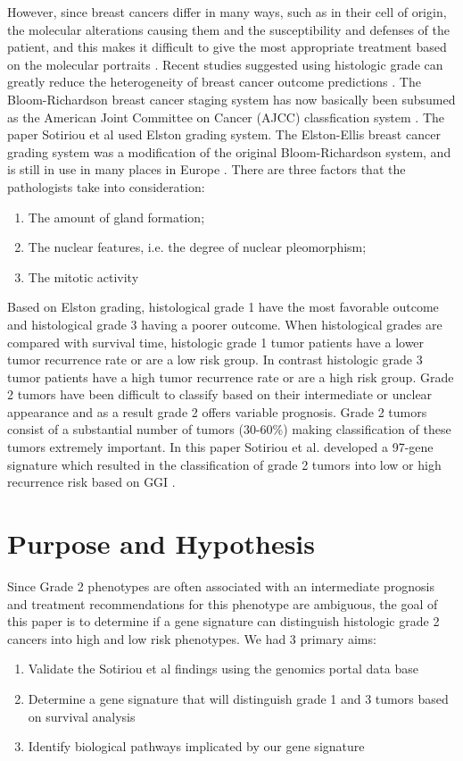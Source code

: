 \documentclass[a4paper,10pt]{article}
\begin{document}
However, since breast cancers differ in many ways, such as in their cell of origin, the 
molecular alterations causing them and the susceptibility and defenses of the patient, 
and this makes it difficult to give the most appropriate treatment based on the molecular
 portraits \cite{bertucci1}. Recent studies suggested using histologic grade can greatly reduce the 
heterogeneity of breast cancer outcome  predictions \cite{dalton1}. The Bloom-Richardson
 breast cancer staging system has now basically been subsumed as the American 
Joint Committee on Cancer (AJCC) classfication system \cite{bloom1}. The paper Sotiriou et al 
used Elston grading system. The Elston-Ellis breast cancer grading system was a 
modification of the original Bloom-Richardson system, and is still in use in many 
places in Europe \cite{Elston1}. There are three factors that the pathologists take into consideration: 

\begin{enumerate}
 \item The amount of gland formation; 
 \item The nuclear features, i.e. the degree of nuclear pleomorphism; 
 \item The mitotic activity \cite{Elston1}
\end{enumerate}

Based on Elston grading, histological grade 1 have the most favorable outcome and 
histological grade 3 having a poorer outcome. When histological grades are compared with
 survival time, histologic grade 1 tumor patients have a lower tumor recurrence rate or are a low 
risk group. In contrast histologic grade 3 tumor patients have a high tumor recurrence rate or are a
 high risk group. Grade 2 tumors have been difficult to classify based on their intermediate or 
unclear appearance and as a result grade 2 offers variable prognosis. Grade 2 tumors consist 
of a substantial number of tumors (30-60\%) making classification of these tumors 
extremely important. In this paper Sotiriou et al. developed a 97-gene signature which 
resulted in the classification of grade 2 tumors into low or high recurrence risk based on GGI \cite{bertucci1}.\\

\section{Purpose and Hypothesis}
Since Grade 2 phenotypes are often associated with an intermediate prognosis and treatment 
recommendations for this phenotype are ambiguous, the goal of this paper is to determine if a 
gene signature can distinguish histologic grade 2 cancers into high and low risk phenotypes.  
We had 3 primary aims: 
\begin{enumerate}
 \item Validate the Sotiriou et al findings using the genomics portal data base
 \item Determine a gene signature that will distinguish grade 1 and 3 tumors based on survival analysis
 \item Identify biological pathways implicated by our gene signature
\end{enumerate}
\end{document}
